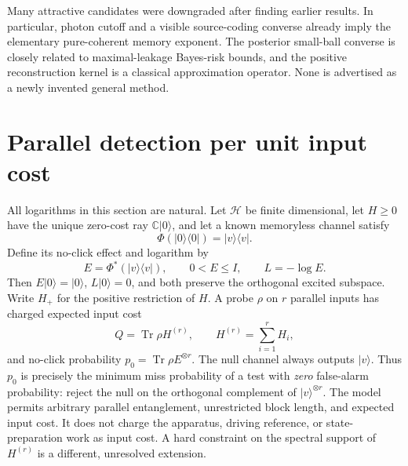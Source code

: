 \documentclass[11pt]{article}
\newcommand{\Tr}{\operatorname{Tr}}
\newcommand{\ket}[1]{|#1\rangle}
\newcommand{\bra}[1]{\langle#1|}
\newcommand{\C}{\mathbb C}
\begin{document}
Many attractive candidates were downgraded after finding earlier results. In particular, photon cutoff and a visible source-coding converse already imply the elementary pure-coherent memory exponent. The posterior small-ball converse is closely related to maximal-leakage Bayes-risk bounds, and the positive reconstruction kernel is a classical approximation operator. None is advertised as a newly invented general method.

\section{Parallel detection per unit input cost}\label{sec:energy}
All logarithms in this section are natural. Let $\mathcal H$ be finite dimensional, let $H\geq0$ have the unique zero-cost ray $\C\ket0$, and let a known memoryless channel satisfy
\[
 \Phi(\ket0\bra0)=\ket v\bra v.
\]
Define its no-click effect and logarithm by
\[
 E=\Phi^*(\ket v\bra v),\qquad 0<E\leq I,\qquad L=-\log E.
\]
Then $E\ket0=\ket0$, $L\ket0=0$, and both preserve the orthogonal excited subspace. Write $H_+$ for the positive restriction of $H$. A probe $\rho$ on $r$ parallel inputs has charged expected input cost
\[
 Q=\Tr\rho H^{(r)},\qquad H^{(r)}=\sum_{i=1}^r H_i,
\]
and no-click probability $p_0=\Tr\rho E^{\otimes r}$. The null channel always outputs $\ket v$. Thus $p_0$ is precisely the minimum miss probability of a test with \emph{zero} false-alarm probability: reject the null on the orthogonal complement of $\ket v^{\otimes r}$. The model permits arbitrary parallel entanglement, unrestricted block length, and expected input cost. It does not charge the apparatus, driving reference, or state-preparation work as input cost. A hard constraint on the spectral support of $H^{(r)}$ is a different, unresolved extension.
\end{document}
